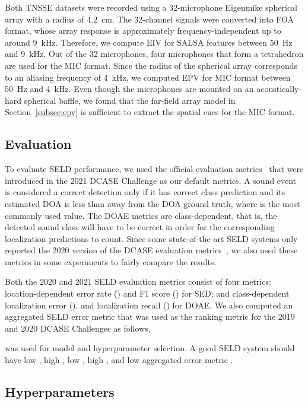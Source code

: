\documentclass[journal]{IEEEtran}
\begin{document}
Both TNSSE datasets were recorded using a \num{32}-microphone Eigenmike spherical array with a radius of \SI{4.2}{\centi\meter}. The \num{32}-channel signals were converted into FOA format, whose array response is approximately frequency-independent up to around \SI{9}{\kilo\hertz}. Therefore, we compute EIV for SALSA features between \SI{50}{\hertz} and \SI{9}{\kilo\hertz}. Out of the \num{32} microphones, four microphones that form a tetrahedron are used for the MIC format. Since the radius of the spherical array corresponds to an aliasing frequency of \SI{4}{\kilo\hertz}, we computed EPV for MIC format between \SI{50}{\hertz} and \SI{4}{\kilo\hertz}. Even though the microphones are mounted on an acoustically-hard spherical baffle, we found that the far-field array model in Section~\ref{subsec:epv} is sufficient to extract the spatial cues for the MIC format. 

\subsection{Evaluation}

To evaluate SELD performance, we used the official evaluation metrics~\cite{Politis2020Overview2019} that were introduced in the 2021 DCASE Challenge as our default metrics. 
A sound event is considered a correct detection only if it has correct class prediction and its estimated DOA is less than  away from the DOA ground truth, where  is the most commonly used value. The DOAE metrics are class-dependent, that is, the detected sound class will have to be correct in order for the corresponding localization predictions to count. Since some state-of-the-art SELD systems only reported the 2020 version of the DCASE evaluation metrics~\cite{Mesaros2019JointEvents}, we also used these metrics in some experiments to fairly compare the results.

Both the 2020 and 2021 SELD evaluation metrics consist of four metrics: location-dependent error rate () and F1 score () for SED; and class-dependent localization error (), and localization recall () for DOAE. We also computed an aggregated SELD error metric that was used as the ranking metric for the 2019 and 2020 DCASE Challenges as follows, 

 was used for model and hyperparameter selection. A good SELD system should have low , high , low , high , and low aggregated error metric .

\subsection{Hyperparameters}
\end{document}
